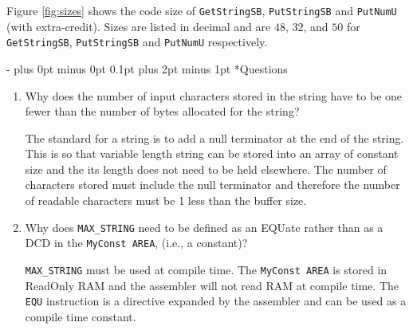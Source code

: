 \documentclass[\FontSize\FontUnit,letterpaper,oneside]{article}
\makeatletter
\def\code#1{\texttt{#1}}
\renewcommand \section{
    \@startsection{section}{1}{\z@}
      {\dimexpr \FontSize\FontUnit * 2 - \parskip \relax plus 0pt minus 0pt}
      {0.1pt plus 2pt minus 1pt} %
      {\normalfont\normalsize\bfseries}}
\makeatother
\begin{document}
Figure \ref{fig:sizes} shows the code size of \code{GetStringSB}, \code{PutStringSB} and \code{PutNumU} (with extra-credit). Sizes are listed in decimal and are $48$, $32$, and $50$ for \code{GetStringSB}, \code{PutStringSB} and \code{PutNumU} respectively.

\section*{Questions}
\begin{enumerate}
\item{Why does the number of input characters stored in the string have to be one fewer than the number of bytes allocated for the string?}

The standard for a string is to add a null terminator at the end of the string. This is so that variable length string can be stored into an array of constant size and the its length does not need to be held elsewhere. The number of characters stored must include the null terminator and therefore the number of readable characters must be 1 less than the buffer size.

\item{Why does \code{MAX\_STRING} need to be defined as an EQUate rather than as a DCD in the \code{MyConst AREA}, (i.e., a constant)?}

\code{MAX\_STRING} must be used at compile time. The \code{MyConst AREA} is stored in ReadOnly RAM and the assembler will not read RAM at compile time. The \code{EQU} instruction is a directive expanded by the assembler and can be used as a compile time constant.
\end{enumerate}


\label{LastPage}
\end{document}
